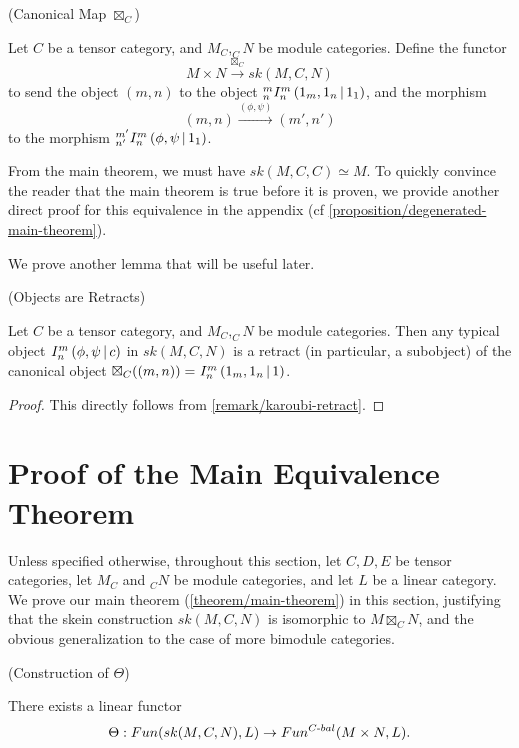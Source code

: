 \begin{definition}\label{definition/canonical-map} (Canonical Map $\boxtimes_{C}$)

  \noindent Let $C$ be a tensor category, and $M_{C}, _{C}N$ be module
  categories. \quad Define the functor
  \[
    M \times N \xrightarrow{\boxtimes_{C}} sk(M,C,N)
  \]
  to send the object $(m,n)$ to the object ${}^{m}_{n} I^{m}_{n} \left( 1_{m}, 1_{n} \,\middle|\, 1_{1} \right)$, and the morphism
  \[
    (m,n) \xrightarrow{(\phi, \psi)} (m', n')
  \]
  to the morphism ${}^{m'}_{n'} I^{m}_{n} \left( \phi, \psi \,\middle|\, 1_{1} \right)$.
\end{definition}

\noindent From the main theorem, we must have $sk(M,C,C) \simeq M$. To quickly
convince the reader that the main theorem is true before it is proven, we
provide another direct proof for this equivalence in the appendix (cf
\ref{proposition/degenerated-main-theorem}).

\hfill\break
\noindent We prove another lemma that will be useful later.

\begin{lemma}\label{lemma/I-provides-subobject} (Objects are Retracts)

  \noindent Let $C$ be a tensor category, and $M_{C}, _{C}N$ be module
  categories. \quad Then any typical object ${}^{}_{} I^{m}_{n} \left( \phi, \psi \,\middle|\, c \right)$ in
  $sk(M,C,N)$ is a retract (in particular, a subobject) of the canonical
  object $\boxtimes_{C}((m,n)) = {}^{}_{} I^{m}_{n} \left( 1_{m}, 1_{n} \,\middle|\, 1 \right)$.
\end{lemma}
\begin{proof}
  This directly follows from \ref{remark/karoubi-retract}.
\end{proof}

\section{Proof of the Main Equivalence Theorem}\label{section/proof-of-equivalence}

Unless specified otherwise, throughout this section, let $C, D, E$ be tensor
categories, let $M_{C}$ and $_{C}N$ be module categories, and let $L$ be a
linear category. We prove our main theorem (\ref{theorem/main-theorem}) in this section, justifying
that the skein construction $sk(M,C,N)$ is isomorphic to $M \boxtimes_{C} N$, and the
obvious generalization to the case of more bimodule categories.

\begin{lemma}\label{lemma/construction-of-theta} (Construction of $\Theta$)

  \noindent There exists a linear functor
  \[
    \Theta: Fun(sk(M,C,N), L) \to Fun^{C{\text -}bal}(M \times N, L).
  \]
\end{lemma}

